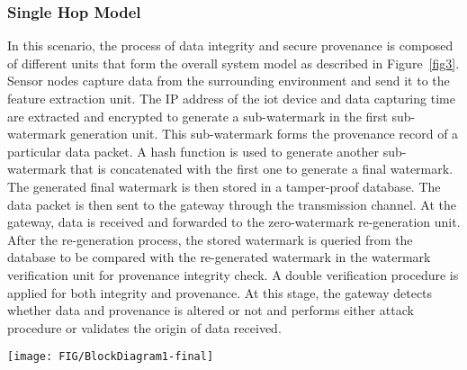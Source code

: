 \documentclass{llncs}
\begin{document}
\subsubsection{Single Hop Model}
In this scenario, the process of data integrity and secure provenance is composed of different units that form the overall system model as described in Figure~\ref{fig3}. Sensor nodes capture data from the surrounding environment and send it to the feature extraction unit. The IP address of the \gls*{iot} device and data capturing time are extracted and encrypted to generate a sub-watermark in the first sub-watermark generation unit. This sub-watermark forms the provenance record of a particular data packet. A hash function is used to generate another sub-watermark that is concatenated with the first one to generate a final watermark. The generated final watermark is then stored in a tamper-proof database. The data packet is then sent to the gateway through the transmission channel. At the gateway, data is received and forwarded to the zero-watermark re-generation unit. After the re-generation process, the stored watermark is queried from the database to be compared with the re-generated watermark in the watermark verification unit for provenance integrity check. A double verification procedure is applied for both integrity and provenance. At this stage, the gateway detects whether data and provenance is altered or not and performs either attack procedure or validates the origin of data received. 

\begin{figure*}[t]
\centerline{\texttt{[image: FIG/BlockDiagram1-final]}}
\caption{Zero-watermark generation, storing and verification block diagram in single hop scenario.}
\label{fig3}
\end{figure*}
\end{document}
